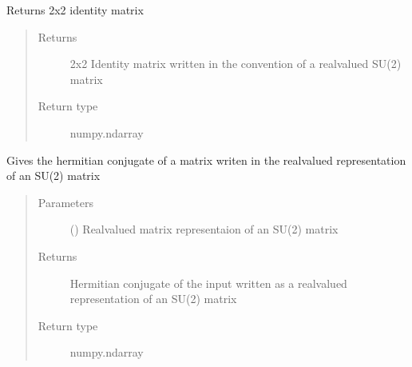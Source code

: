 \documentclass[letterpaper,10pt,english]{sphinxmanual}
\begin{document}

\begin{fulllineitems}
\label{\detokenize{index:su2.cstart}}
Returns 2x2 identity matrix
\begin{quote}\begin{description}
\item[{Returns}] \leavevmode
2x2 Identity matrix written in the convention of a real\sphinxhyphen{}valued
SU(2) matrix

\item[{Return type}] \leavevmode
numpy.ndarray

\end{description}\end{quote}

\end{fulllineitems}


\begin{fulllineitems}
\label{\detokenize{index:su2.dag}}
Gives the hermitian conjugate of a matrix writen in the
real\sphinxhyphen{}valued representation of an SU(2) matrix
\begin{quote}\begin{description}
\item[{Parameters}] \leavevmode
{} () \textendash{} Real\sphinxhyphen{}valued matrix representaion of an SU(2) matrix

\item[{Returns}] \leavevmode
Hermitian conjugate of the input written as a real\sphinxhyphen{}valued
representation of an SU(2) matrix

\item[{Return type}] \leavevmode
numpy.ndarray

\end{description}\end{quote}

\end{fulllineitems}

\end{document}

